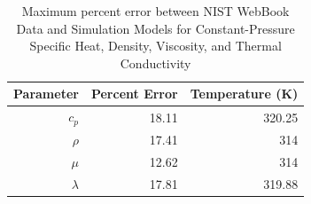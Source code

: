 \begin{table}[H]
\caption{Maximum percent error between NIST WebBook Data and Simulation Models for Constant-Pressure Specific Heat, Density, Viscosity, and Thermal Conductivity}
\label{max_error}
\begin{center}
\begin{tabular}{ r || r r }
Parameter & Percent Error & Temperature (K)  \\
\hline
$c_p$ & 18.11 & 320.25  \\
$\rho$ & 17.41 & 314  \\
$\mu$ & 12.62 & 314  \\
$\lambda$ & 17.81 & 319.88  \\

\end{tabular}
\end{center}
\end{table}




